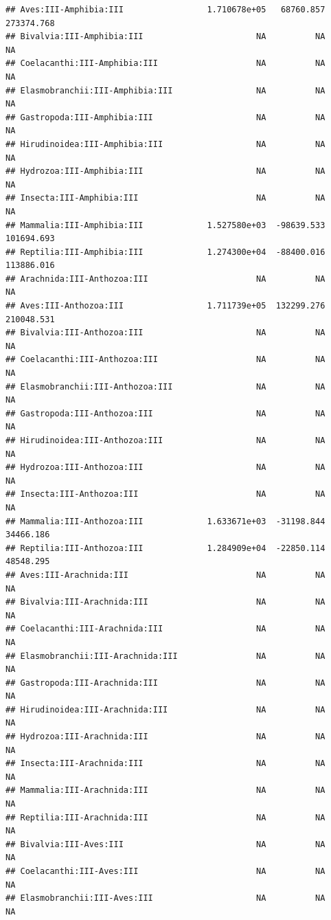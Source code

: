 \documentclass[
  12pt,
]{article}
\begin{document}
\begin{verbatim}
## Aves:III-Amphibia:III                 1.710678e+05   68760.857  273374.768
## Bivalvia:III-Amphibia:III                       NA          NA          NA
## Coelacanthi:III-Amphibia:III                    NA          NA          NA
## Elasmobranchii:III-Amphibia:III                 NA          NA          NA
## Gastropoda:III-Amphibia:III                     NA          NA          NA
## Hirudinoidea:III-Amphibia:III                   NA          NA          NA
## Hydrozoa:III-Amphibia:III                       NA          NA          NA
## Insecta:III-Amphibia:III                        NA          NA          NA
## Mammalia:III-Amphibia:III             1.527580e+03  -98639.533  101694.693
## Reptilia:III-Amphibia:III             1.274300e+04  -88400.016  113886.016
## Arachnida:III-Anthozoa:III                      NA          NA          NA
## Aves:III-Anthozoa:III                 1.711739e+05  132299.276  210048.531
## Bivalvia:III-Anthozoa:III                       NA          NA          NA
## Coelacanthi:III-Anthozoa:III                    NA          NA          NA
## Elasmobranchii:III-Anthozoa:III                 NA          NA          NA
## Gastropoda:III-Anthozoa:III                     NA          NA          NA
## Hirudinoidea:III-Anthozoa:III                   NA          NA          NA
## Hydrozoa:III-Anthozoa:III                       NA          NA          NA
## Insecta:III-Anthozoa:III                        NA          NA          NA
## Mammalia:III-Anthozoa:III             1.633671e+03  -31198.844   34466.186
## Reptilia:III-Anthozoa:III             1.284909e+04  -22850.114   48548.295
## Aves:III-Arachnida:III                          NA          NA          NA
## Bivalvia:III-Arachnida:III                      NA          NA          NA
## Coelacanthi:III-Arachnida:III                   NA          NA          NA
## Elasmobranchii:III-Arachnida:III                NA          NA          NA
## Gastropoda:III-Arachnida:III                    NA          NA          NA
## Hirudinoidea:III-Arachnida:III                  NA          NA          NA
## Hydrozoa:III-Arachnida:III                      NA          NA          NA
## Insecta:III-Arachnida:III                       NA          NA          NA
## Mammalia:III-Arachnida:III                      NA          NA          NA
## Reptilia:III-Arachnida:III                      NA          NA          NA
## Bivalvia:III-Aves:III                           NA          NA          NA
## Coelacanthi:III-Aves:III                        NA          NA          NA
## Elasmobranchii:III-Aves:III                     NA          NA          NA

\end{verbatim}
\end{document}
